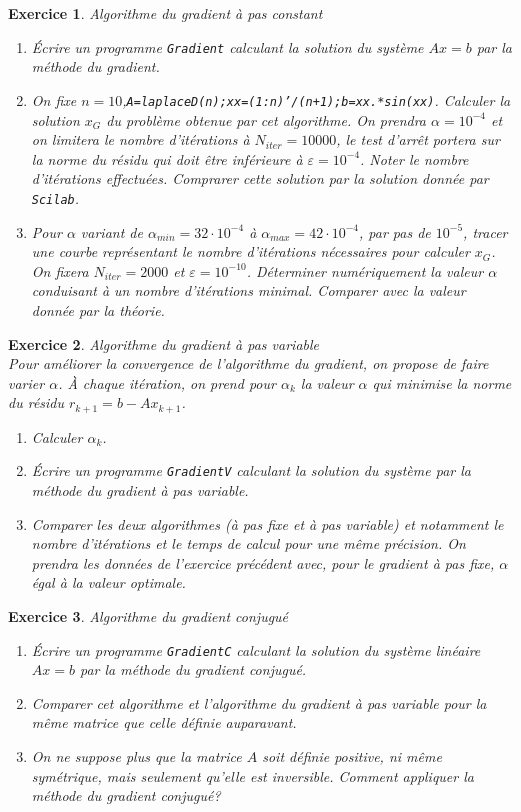 \documentclass[leqno]{article}
\theoremstyle{exo}
\theoremstyle{exo}
\newtheorem{exe}{Exercice}
\begin{document}
\begin{exe}{\it Algorithme du gradient \`a pas constant}
\begin{enumerate}
\item \'Ecrire un programme \texttt{Gradient} calculant la solution du syst\`eme $Ax=b$ par la m\'ethode du gradient.
\item On fixe $n=10$,\texttt{A=laplaceD(n);xx=(1:n)'/(n+1);b=xx.*sin(xx)}. Calculer la solution $x_G$ du probl\`eme obtenue par cet algorithme. On prendra $\alpha=10^{-4}$ et on limitera le nombre d'it\'erations \`a $N_{iter}=10000$, le test d'arr\^et portera sur la norme du r\'esidu qui doit \^etre inf\'erieure \`a $\varepsilon=10^{-4}$. Noter le nombre d'it\'erations effectu\'ees. Comprarer cette solution par la solution donn\'ee par \texttt{Scilab}.
\item Pour $\alpha$ variant de $\alpha_{min}=32\cdot 10^{-4}$ \`a $\alpha_{max}=42\cdot 10^{-4}$, par pas de $10^{-5}$, tracer une courbe repr\'esentant le nombre d'it\'erations n\'ecessaires pour calculer $x_G$. On fixera $N_{iter}=2000$ et $\varepsilon=10^{-10}$. D\'eterminer num\'eriquement la valeur $\alpha$ conduisant \`a un nombre d'it\'erations minimal. Comparer avec la valeur donn\'ee par la th\'eorie. 
\end{enumerate}
\end{exe}

\begin{exe}{\it Algorithme du gradient \`a pas variable}\\
Pour am\'eliorer la convergence de l'algorithme du gradient, on propose de faire varier $\alpha$. \`A chaque it\'eration, on prend pour $\alpha_k$ la valeur $\alpha$ qui minimise la norme du r\'esidu $r_{k+1}=b-Ax_{k+1}$.
\begin{enumerate}
\item Calculer $\alpha_k$.
\item \'Ecrire un programme \texttt{GradientV} calculant la solution du syst\`eme par la m\'ethode du gradient \`a pas variable.
\item Comparer les deux algorithmes (\`a pas fixe et \`a pas variable) et notamment le nombre d'it\'erations et le temps de calcul pour une m\^eme pr\'ecision. On prendra les donn\'ees de l'exercice pr\'ec\'edent avec, pour le gradient \`a pas fixe, $\alpha$ \'egal \`a la valeur optimale. 
\end{enumerate}
\end{exe}


\begin{exe}{\it Algorithme du gradient conjugu\'e}
\begin{enumerate}
\item \'Ecrire un programme \texttt{GradientC} calculant la solution du syst\`eme lin\'eaire $Ax=b$ par la m\'ethode du gradient conjugu\'e.
\item Comparer cet algorithme et l'algorithme du gradient \`a pas variable pour la m\^eme matrice que celle d\'efinie auparavant.
\item On ne suppose plus que la matrice $A$ soit d\'efinie positive, ni m\^eme sym\'etrique, mais seulement qu'elle est inversible. Comment appliquer la m\'ethode du gradient conjugu\'e?  
\end{enumerate}
\end{exe}
\end{document}
